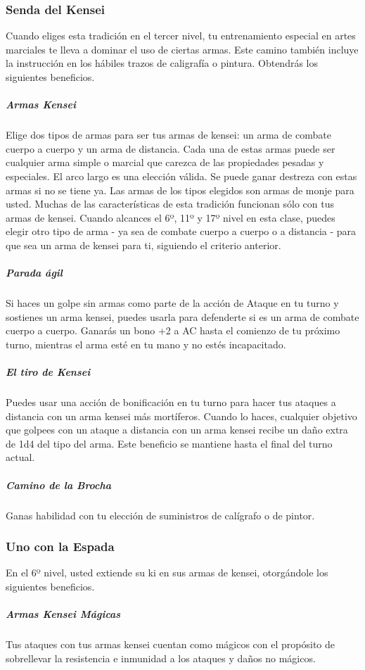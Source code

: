 \documentclass[a4paper,twocolumn,openany,10pt]{dndbook}
\begin{document}
\subsubsection{Senda del Kensei}
Cuando eliges esta tradición en el tercer nivel, tu entrenamiento especial en artes marciales te lleva a dominar el uso de
ciertas armas. Este camino también incluye la instrucción en los hábiles trazos de caligrafía o pintura. Obtendrás los
siguientes beneficios.

\subparagraph{Armas Kensei} Elige dos tipos de armas para ser tus armas de kensei: un arma de combate cuerpo a cuerpo y un arma
de distancia. Cada una de estas armas puede ser cualquier arma simple o marcial que carezca de las propiedades pesadas y
especiales. El arco largo es una elección válida. Se puede ganar destreza con estas armas si no se tiene ya. Las armas de los
tipos elegidos son armas de monje para usted. Muchas de las características de esta tradición funcionan sólo con tus armas de
kensei. Cuando alcances el 6º, 11º y 17º nivel en esta clase, puedes elegir otro tipo de arma - ya sea de combate cuerpo a
cuerpo o a distancia - para que sea un arma de kensei para ti, siguiendo el criterio anterior.

\subparagraph{Parada ágil} Si haces un golpe sin armas como parte de la acción de Ataque en tu turno y sostienes un arma kensei,
puedes usarla para defenderte si es un arma de combate cuerpo a cuerpo. Ganarás un bono +2 a AC hasta el comienzo de tu próximo
turno, mientras el arma esté en tu mano y no estés incapacitado.

\subparagraph{El tiro de Kensei} Puedes usar una acción de bonificación en tu turno para hacer tus ataques a distancia con un
arma kensei más mortíferos. Cuando lo haces, cualquier objetivo que golpees con un ataque a distancia con un arma kensei recibe
un daño extra de 1d4 del tipo del arma. Este beneficio se mantiene hasta el final del turno actual.

\subparagraph{Camino de la Brocha} Ganas habilidad con tu elección de suministros de calígrafo o de pintor.

\subsubsection{Uno con la Espada}
En el 6º nivel, usted extiende su ki en sus armas de kensei, otorgándole los siguientes beneficios. 

\subparagraph{Armas Kensei Mágicas} Tus ataques con tus armas kensei cuentan como mágicos con el propósito de sobrellevar la
resistencia e inmunidad a los ataques y daños no mágicos.
\end{document}
